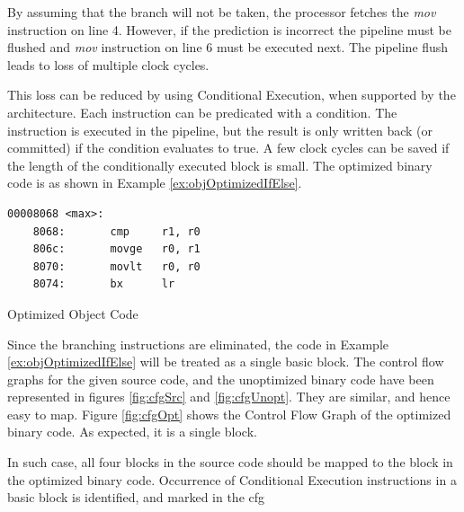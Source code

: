 By assuming that the branch will not be taken, the processor fetches the \emph{mov} instruction on line 4. However, if the prediction is incorrect the pipeline must be flushed and \emph{mov} instruction on line 6 must be executed next. The pipeline flush leads to loss of multiple clock cycles.

This loss can be reduced by using Conditional Execution, when supported by the architecture. Each instruction can be predicated with a condition. The instruction is executed in the pipeline, but the result is only written back (or committed) if the condition evaluates to true. A few clock cycles can be saved if the length of the conditionally executed block is small. The optimized binary code is as shown in Example \ref{ex:objOptimizedIfElse}.

\begin{Example}[h]
\begin{lstlisting}
00008068 <max>:
    8068:       cmp     r1, r0
    806c:       movge   r0, r1
    8070:       movlt   r0, r0
    8074:       bx      lr
\end{lstlisting}
\caption{Optimized Object Code}
\label{ex:objOptimizedIfElse}
\end{Example}

Since the branching instructions are eliminated, the code in Example \ref{ex:objOptimizedIfElse} will be treated as a single basic block. The control flow graphs for the given source code, and the unoptimized binary code have been represented in figures \ref{fig:cfgSrc} and \ref{fig:cfgUnopt}. They are similar, and hence easy to map. Figure \ref{fig:cfgOpt} shows the Control Flow Graph of the optimized binary code. As expected, it is a single block. 

In such case, all four blocks in the source code should be mapped to the block in the optimized binary code. Occurrence of Conditional Execution instructions in a basic block is identified, and marked in the \gls{cfg} 

